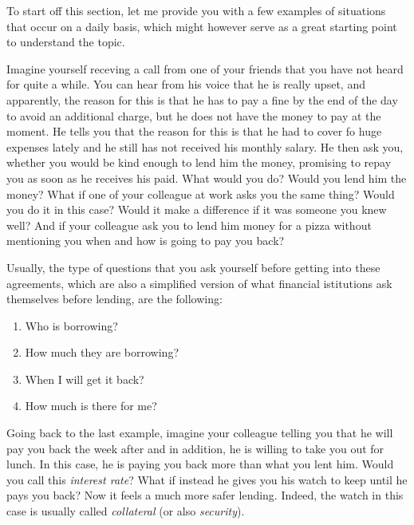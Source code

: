 \documentclass[a4paper,12pt]{article}
\begin{document}
        To start off this section, let me provide you with a few examples of situations that occur on a daily basis, which
        might however serve as a great starting point to understand the topic. 
    
        Imagine yourself receving a call from one of your friends that you have not heard for quite a while. 
        You can hear from his voice that he is really upset, and apparently, the reason for this is that he has to pay a fine 
        by the end of the day to avoid an additional charge, but he does not have the money to pay at the moment. 
        He tells you that the reason for this is that he had to cover fo huge expenses lately and he still has not received his monthly salary. 
        He then ask you, whether you would be kind enough to lend him the money, promising to repay you as soon as he receives his paid.
        What would you do? Would you lend him the money? What if one of your colleague at work asks you the same thing? Would you do it in this case? 
        Would it make a difference if it was someone you knew well? And if your colleague ask you to lend him money for a pizza without mentioning you when and 
        how is going to pay you back? 
    
        Usually, the type of questions that you ask yourself before getting into these agreements, which are also a simplified
        version of what financial istitutions ask themselves before lending, are the following: 

        \begin{enumerate}
            \item Who is borrowing?
            \item How much they are borrowing?
            \item When I will get it back?
            \item How much is there for me?
        \end{enumerate}

        Going back to the last example, imagine your colleague telling you that he will pay you back the week after and in addition, he is willing
        to take you out for lunch. In this case, he is paying you back more than what you lent him. Would you call this \textit{interest rate}? 
        What if instead he gives you his watch to keep until he pays you back? Now it feels a much more safer lending. Indeed, the watch
        in this case is usually called \textit{collateral} (or also \textit{security}).
\end{document}
